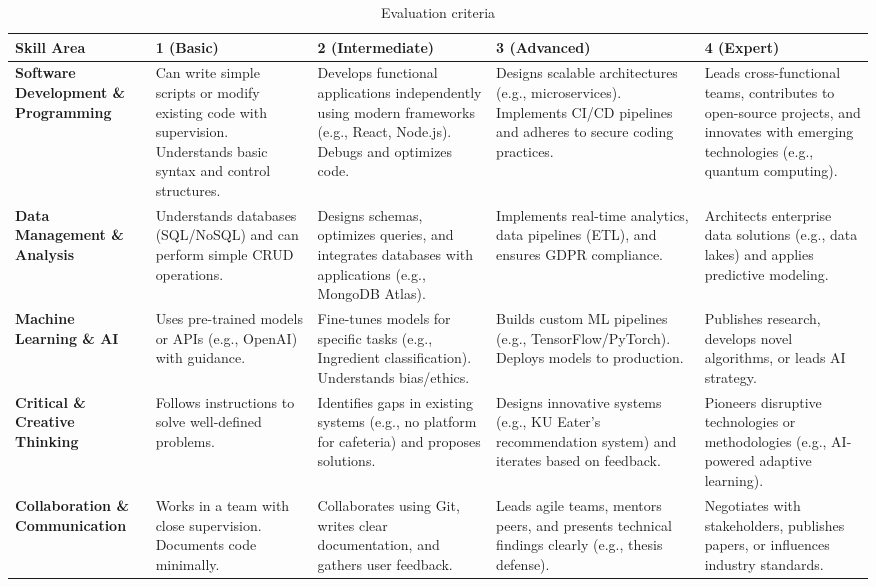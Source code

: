 \begin{table}[ht!]
    \begin{adjustwidth}{-.85in}{-.85in}
        \noindent
        \centering
        \small\begin{tabularx}{1.3\textwidth}{|X|X|X|X|X|}
            \hline
            \textbf{Skill Area} & \textbf{1 (Basic)} & \textbf{2 (Intermediate)} & \textbf{3 (Advanced)} & \textbf{4 (Expert)} \\\hline
            \textbf{Software Development \& Programming} & Can write simple scripts or modify existing code with supervision. Understands basic syntax and control structures. & Develops functional applications independently using modern frameworks (e.g., React, Node.js). Debugs and optimizes code. & Designs scalable architectures (e.g., microservices). Implements CI/CD pipelines and adheres to secure coding practices. & Leads cross-functional teams, contributes to open-source projects, and innovates with emerging technologies (e.g., quantum computing). \\\hline
            \textbf{Data Management \& Analysis} & Understands databases (SQL/NoSQL) and can perform simple CRUD operations. & Designs schemas, optimizes queries, and integrates databases with applications (e.g., MongoDB Atlas). & Implements real-time analytics, data pipelines (ETL), and ensures GDPR compliance. & Architects enterprise data solutions (e.g., data lakes) and applies predictive modeling. \\\hline
            \textbf{Machine Learning \& AI} & Uses pre-trained models or APIs (e.g., OpenAI) with guidance. & Fine-tunes models for specific tasks (e.g., Ingredient classification). Understands bias/ethics. & Builds custom ML pipelines (e.g., TensorFlow/PyTorch). Deploys models to production. & Publishes research, develops novel algorithms, or leads AI strategy. \\\hline
            \textbf{Critical \& Creative Thinking} & Follows instructions to solve well-defined problems. & Identifies gaps in existing systems (e.g., no platform for cafeteria) and proposes solutions. & Designs innovative systems (e.g., KU Eater's recommendation system) and iterates based on feedback. & Pioneers disruptive technologies or methodologies (e.g., AI-powered adaptive learning). \\\hline
            \textbf{Collaboration \& Communication} & Works in a team with close supervision. Documents code minimally. & Collaborates using Git, writes clear documentation, and gathers user feedback. & Leads agile teams, mentors peers, and presents technical findings clearly (e.g., thesis defense). & Negotiates with stakeholders, publishes papers, or influences industry standards. \\\hline
        \end{tabularx}
    \end{adjustwidth}
    \caption{Evaluation criteria}
    \label{table:evaluation-criteria}
\end{table}

